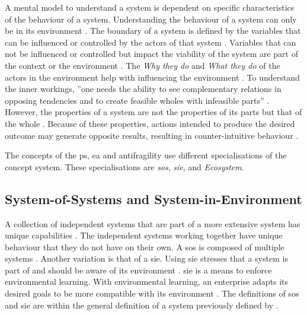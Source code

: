 A mental model to understand a system is dependent on specific characteristics of the behaviour of a system. Understanding the behaviour of a system can only be in its environment \parencite[p.~29]{Gharajedaghi2011}. The boundary of a system is defined by the variables that can be influenced or controlled by the actors of that system \parencite[p.~182]{Gharajedaghi2011}. Variables that can not be influenced or controlled but impact the viability of the system are part of the context \parencite[p.~183]{Gharajedaghi2011} or the environment \parencite[p.~13--14]{Mannaert2016}. The \textit{Why they do} and \textit{What they do} of the actors in the environment help with influencing the environment \parencite[p.~33]{Gharajedaghi2011}. To understand the inner workings, ''one needs the ability to see complementary relations in opposing tendencies and to create feasible wholes with infeasible parts'' \parencite[p.~38]{Gharajedaghi2011}. However, the properties of a system are not the properties of its parts but that of the whole \parencites{Ackoff1973}{Gharajedaghi2011}. Because of these properties, actions intended to produce the desired outcome may generate opposite results, resulting in counter-intuitive behaviour \parencite[p.~48]{Gharajedaghi2011}.

The concepts of the \gls{ps}, \gls{ea} and \gls{antifragility} use different \glspl{specialisation} of the concept system. These \glspl{specialisation} are \textit{\gls{sos}}, \textit{\gls{sie}}, and \textit{Ecosystem}.
\subsection{System-of-Systems and System-in-Environment}
\label{sub:tbsysofsys}
A collection of independent systems that are part of a more extensive system has unique capabilities \parencite{INCOSE2018}. The independent systems working together have unique behaviour that they do not have on their own.  A \gls{sos} is composed of multiple systems \parencites{Ackoff1973}{Gharajedaghi2011}. Another variation is that of a \gls{sie}. Using \gls{sie} stresses that a system is part of and should be aware of its environment \parencites{Gharajedaghi2011}{Lapalme2012}{Korhonen2016}{Mannaert2016}. \gls{sie} is a means to enforce environmental learning. With environmental learning, an enterprise adapts its desired goals to be more compatible with its environment \parencite[p.~41]{Lapalme2012}. The definitions of \gls{sos} and \gls{sie} are within the general definition of a system previously defined by \textcites{Ackoff1973}[p.~183]{Gharajedaghi2011}[pp.~13--14]{Mannaert2016}.

